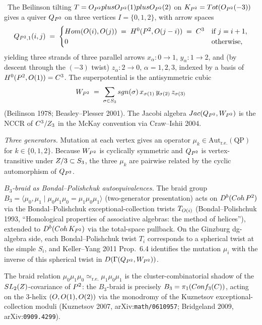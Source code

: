 \begin{example}
\label{ex:local-p2-mutations}
\ClaimStatusDerivation\ The Beilinson tilting
$T = O_{P^2} plus O_{P^2}(1) plus O_{P^2}(2)$ on
$K_{P^2} = Tot(O_{P^2}(-3))$ gives a quiver $Q_{P^2}$ on three
vertices $I = \{0, 1, 2\}$, with arrow spaces
\[
  Q_{P^2, 1}(i, j) \;=\;
  \begin{cases}
    Hom(O(i), O(j)) \;=\; H^{0}(P^2, O(j - i)) \;=\; C^{3} &
    \text{if } j = i + 1, \\
    0 & \text{otherwise,}
  \end{cases}
\]
yielding three strands of three parallel arrows $x_\alpha \colon 0 \to 1$,
$y_\alpha \colon 1 \to 2$, and (by descent through the $(-3)$ twist)
$z_\alpha \colon 2 \to 0$, $\alpha = 1, 2, 3$, indexed by a basis of
$H^0(P^2, O(1)) = C^3$. The superpotential is the antisymmetric cubic
\[
  W_{P^2} \;=\; \sum_{\sigma \in S_3} sgn(\sigma)\,
  x_{\sigma(1)}\, y_{\sigma(2)}\, z_{\sigma(3)}
\]
(Beilinson 1978; Beasley--Plesser 2001). The Jacobi algebra
$Jac(Q_{P^2}, W_{P^2})$ is the NCCR of $C^3/Z_3$ in the McKay
convention via Craw--Ishii 2004.

\emph{Three generators.} Mutation at each vertex gives an operator
$\mu_k \in \mathrm{Aut}_{\mathrm{r.e.}}(\text{QP})$ for $k \in \{0, 1, 2\}$.
Because $W_{P^2}$ is cyclically symmetric and $Q_{P^2}$ is
vertex-transitive under $Z/3 \subset S_3$, the three $\mu_k$ are pairwise
related by the cyclic automorphism of $Q_{P^2}$.

\emph{$B_3$-braid as Bondal--Polishchuk autoequivalences.} The braid group
$B_3 = \langle \mu_0, \mu_1 \mid \mu_0 \mu_1 \mu_0 = \mu_1 \mu_0 \mu_1 \rangle$
(two-generator presentation) acts on $D^b(Coh\, P^2)$ via the
Bondal--Polishchuk exceptional-collection twists $T_{O(i)}$
(Bondal--Polishchuk 1993, ``Homological properties of associative algebras:
the method of helices''), extended to $D^b(Coh\, K_{P^2})$ via the
total-space pullback. On the Ginzburg dg-algebra side, each Bondal--Polishchuk
twist $T_i$ corresponds to a spherical twist at the simple $S_i$, and
Keller--Yang 2011 Prop.~6.4 identifies the mutation $\mu_i$ with the inverse
of this spherical twist in $D(\Gamma(Q_{P^2}, W_{P^2}))$.

The braid relation $\mu_0 \mu_1 \mu_0 \simeq_{\mathrm{r.e.}} \mu_1 \mu_0
\mu_1$ is the cluster-combinatorial shadow of the $SL_2(Z)$-covariance
of $P^2$: the $B_3$-braid is precisely $B_3 = \pi_1(Conf_3(C))$,
acting on the $3$-helix $(O, O(1), O(2))$ via the monodromy of the
Kuznetsov exceptional-collection moduli (Kuznetsov 2007, arXiv:\texttt{math/0610957};
Bridgeland 2009, arXiv:\texttt{0909.4299}).


\end{example}
